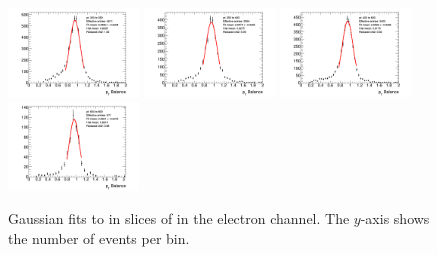 \begin{figure}[t]
    \includegraphics[width=0.31\textwidth]{plots/insitu/fits_data_zee_nominal/Zeejet_Nominal_Bin7.png}
    \includegraphics[width=0.31\textwidth]{plots/insitu/fits_data_zee_nominal/Zeejet_Nominal_Bin8.png}
    \includegraphics[width=0.31\textwidth]{plots/insitu/fits_data_zee_nominal/Zeejet_Nominal_Bin9.png}
    \includegraphics[width=0.31\textwidth]{plots/insitu/fits_data_zee_nominal/Zeejet_Nominal_Bin10.png}
    \caption{Gaussian fits to \ptbal in slices of \ptref in the electron channel. The $y$-axis shows the number of events per bin.\label{fig:insitu:zeedatafits}}
\end{figure}

